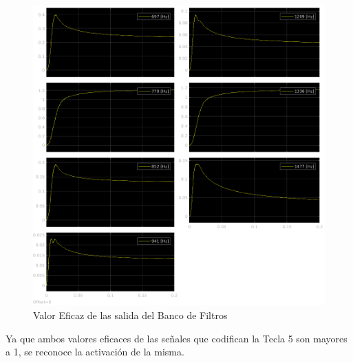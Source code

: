 \begin{figure}[H]
  \centering
  \includegraphics[width=\linewidth]{images/simulacion/fallas/rms/5.png}
  \caption{Valor Eficaz de las salida del Banco de Filtros }
  \label{fig:num_5_rms}
\end{figure}

Ya que ambos valores eficaces de las señales que codifican la Tecla 5 son mayores a 1, se reconoce la activación de la misma.


